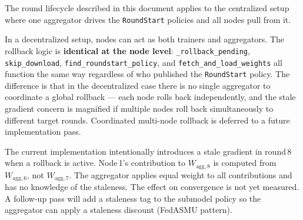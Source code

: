 \documentclass[11pt,a4paper]{article}
\newcommand{\Wagg}[1]{$W_{\text{agg},#1}$}
\begin{document}
The round lifecycle described in this document applies to the centralized
setup where one aggregator drives the \texttt{RoundStart} policies and all
nodes pull from it.

In a decentralized setup, nodes can act as both trainers and aggregators.
The rollback logic is \textbf{identical at the node level}:
\texttt{\_rollback\_pending}, \texttt{skip\_download},
\texttt{find\_roundstart\_policy}, and \texttt{fetch\_and\_load\_weights}
all function the same way regardless of who published the \texttt{RoundStart}
policy.  The difference is that in the decentralized case there is no single
aggregator to coordinate a global rollback --- each node rolls back
independently, and the stale gradient concern is magnified if multiple nodes
roll back simultaneously to different target rounds.
Coordinated multi-node rollback is deferred to a future implementation pass.

\bigskip
\begin{tcolorbox}[stalebox={Known limitation: stale gradient}]
  The current implementation intentionally introduces a stale gradient in
  round\,8 when a rollback is active.  Node\,1's contribution to \Wagg{8}
  is computed from \Wagg{6}, not \Wagg{7}.  The aggregator applies equal
  weight to all contributions and has no knowledge of the staleness.
  The effect on convergence is not yet measured.
  A follow-up pass will add a staleness tag to the submodel policy so the
  aggregator can apply a staleness discount (FedASMU pattern).
\end{tcolorbox}
\end{document}
